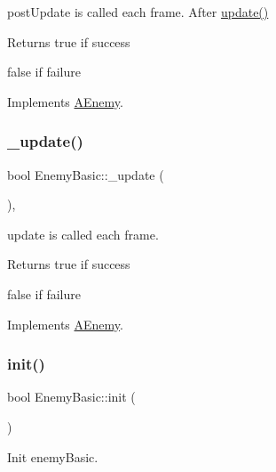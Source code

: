 post\+Update is called each frame. After \hyperlink{class_a_enemy_a01e3b0313d6f29bf2cafe20f711c0550}{update()} 

\begin{DoxyReturn}{Returns}
true if success 

false if failure 
\end{DoxyReturn}


Implements \hyperlink{class_a_enemy_a78b010638f552c4ab11ff71e7b826b1b}{A\+Enemy}.

\mbox{\label{class_enemy_basic_a6b4c43308489726b95641ed9591bdb25}} 
\subsubsection{\texorpdfstring{\+\_\+update()}{\_update()}}
{\footnotesize\ttfamily bool Enemy\+Basic\+::\+\_\+update (\begin{DoxyParamCaption}{ }\end{DoxyParamCaption})\hspace{0.3cm}{\ttfamily [protected]}, {\ttfamily [virtual]}}



update is called each frame. 

\begin{DoxyReturn}{Returns}
true if success 

false if failure 
\end{DoxyReturn}


Implements \hyperlink{class_a_enemy_abefc22131eb1c618819c67c3c1415c08}{A\+Enemy}.

\mbox{\label{class_enemy_basic_a898943e397eb36c80721951a3457178c}} 
\subsubsection{\texorpdfstring{init()}{init()}}
{\footnotesize\ttfamily bool Enemy\+Basic\+::init (\begin{DoxyParamCaption}{ }\end{DoxyParamCaption})\hspace{0.3cm}{\ttfamily [virtual]}}



Init enemy\+Basic. 

